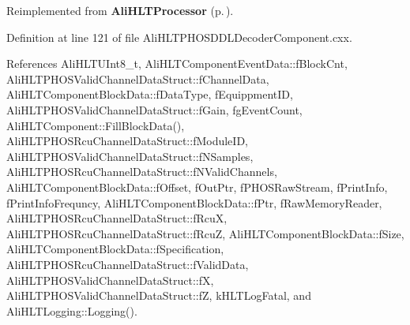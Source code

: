 Reimplemented from {\bf Ali\-HLTProcessor} {\rm (p.\,\pageref{classAliHLTProcessor_d0})}.

Definition at line 121 of file Ali\-HLTPHOSDDLDecoder\-Component.cxx.

References Ali\-HLTUInt8\_\-t, Ali\-HLTComponent\-Event\-Data::f\-Block\-Cnt, Ali\-HLTPHOSValid\-Channel\-Data\-Struct::f\-Channel\-Data, Ali\-HLTComponent\-Block\-Data::f\-Data\-Type, f\-Equippment\-ID, Ali\-HLTPHOSValid\-Channel\-Data\-Struct::f\-Gain, fg\-Event\-Count, Ali\-HLTComponent::Fill\-Block\-Data(), Ali\-HLTPHOSRcu\-Channel\-Data\-Struct::f\-Module\-ID, Ali\-HLTPHOSValid\-Channel\-Data\-Struct::f\-NSamples, Ali\-HLTPHOSRcu\-Channel\-Data\-Struct::f\-NValid\-Channels, Ali\-HLTComponent\-Block\-Data::f\-Offset, f\-Out\-Ptr, f\-PHOSRaw\-Stream, f\-Print\-Info, f\-Print\-Info\-Frequncy, Ali\-HLTComponent\-Block\-Data::f\-Ptr, f\-Raw\-Memory\-Reader, Ali\-HLTPHOSRcu\-Channel\-Data\-Struct::f\-Rcu\-X, Ali\-HLTPHOSRcu\-Channel\-Data\-Struct::f\-Rcu\-Z, Ali\-HLTComponent\-Block\-Data::f\-Size, Ali\-HLTComponent\-Block\-Data::f\-Specification, Ali\-HLTPHOSRcu\-Channel\-Data\-Struct::f\-Valid\-Data, Ali\-HLTPHOSValid\-Channel\-Data\-Struct::f\-X, Ali\-HLTPHOSValid\-Channel\-Data\-Struct::f\-Z, k\-HLTLog\-Fatal, and Ali\-HLTLogging::Logging().

